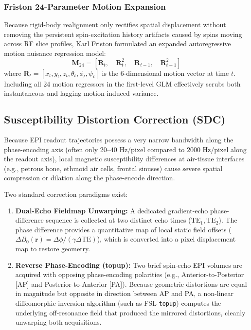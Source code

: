 \documentclass[11pt,a4paper]{article}
\begin{document}
\subsubsection{Friston 24-Parameter Motion Expansion}
Because rigid-body realignment only rectifies spatial displacement without removing the persistent spin-excitation history artifacts caused by spins moving across RF slice profiles, Karl Friston formulated an expanded autoregressive motion nuisance regression model:
\begin{equation}
    \mathbf{M}_{24} = \left[ \mathbf{R}_t, \quad \mathbf{R}_t^2, \quad \mathbf{R}_{t-1}, \quad \mathbf{R}_{t-1}^2 \right]
\end{equation}
where $\mathbf{R}_t = [x_t, y_t, z_t, \theta_t, \phi_t, \psi_t]$ is the 6-dimensional motion vector at time $t$. Including all 24 motion regressors in the first-level GLM effectively scrubs both instantaneous and lagging motion-induced variance.

\subsection{Susceptibility Distortion Correction (SDC)}
Because EPI readout trajectories possess a very narrow bandwidth along the phase-encoding axis (often only $20\text{--}40\text{ Hz/pixel}$ compared to $2000\text{ Hz/pixel}$ along the readout axis), local magnetic susceptibility differences at air-tissue interfaces (e.g., petrous bone, ethmoid air cells, frontal sinuses) cause severe spatial compression or dilation along the phase-encode direction.

Two standard correction paradigms exist:
\begin{enumerate}
    \item \textbf{Dual-Echo Fieldmap Unwarping:} A dedicated gradient-echo phase-difference sequence is collected at two distinct echo times ($\text{TE}_1, \text{TE}_2$). The phase difference provides a quantitative map of local static field offsets ($\Delta B_0(\mathbf{r}) = \Delta \phi / (\gamma \Delta \text{TE})$), which is converted into a pixel displacement map to restore geometry.
    \item \textbf{Reverse Phase-Encoding (topup):} Two brief spin-echo EPI volumes are acquired with opposing phase-encoding polarities (e.g., Anterior-to-Posterior [AP] and Posterior-to-Anterior [PA]). Because geometric distortions are equal in magnitude but opposite in direction between AP and PA, a non-linear diffeomorphic inversion algorithm (such as FSL \texttt{topup}) computes the underlying off-resonance field that produced the mirrored distortions, cleanly unwarping both acquisitions.
\end{enumerate}
\end{document}
